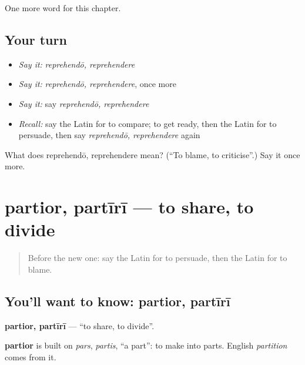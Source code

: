 \begin{grammarlens}[title={What you've built}]
One more word for this chapter.
\end{grammarlens}

\subsection*{Your turn}
\begin{itemize}
\raggedright
  \item \emph{Say it:} \emph{reprehendō, reprehendere}
  \item \emph{Say it:} \emph{reprehendō, reprehendere}, once more
  \item \emph{Say it:} say \emph{reprehendō, reprehendere}
  \item \emph{Recall:} say the Latin for to compare; to get ready, then the Latin for to persuade, then say \emph{reprehendō, reprehendere} again
\end{itemize}

\begin{tcolorbox}[breakable,colback=teal!4,colframe=teal!35!black,title={Before you move on}]
What does reprehendō, reprehendere mean? (\textquotedblleft{}To blame, to criticise\textquotedblright{}.) Say it once more.
\end{tcolorbox}
\section[partior, partīrī]{partior, partīrī — to share, to divide}

\label{lesson:LA-C199-partior}



\begin{quote}
Before the new one: say the Latin for to persuade, then the Latin for to blame.
\end{quote}

\subsection*{You'll want to know: partior, partīrī}
\textbf{partior, partīrī} — \textquotedblleft{}to share, to divide\textquotedblright{}.

\begin{cousinweb}
\textbf{partior} is built on \emph{pars}, \emph{partis}, \textquotedblleft{}a part\textquotedblright{}: to make into parts. English \emph{partition} comes from it.
\end{cousinweb}

